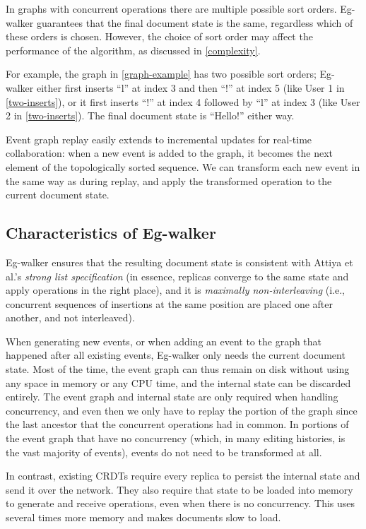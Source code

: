 \documentclass[sigplan,10pt]{acmart}
\newcommand{\algname}{Eg-walker\xspace}
\begin{document}
In graphs with concurrent operations there are multiple possible sort orders. \algname guarantees that the final document state is the same, regardless which of these orders is chosen. However, the choice of sort order may affect the performance of the algorithm, as discussed in \autoref{complexity}.

For example, the graph in \autoref{graph-example} has two possible sort orders; \algname either first inserts ``l'' at index 3 and then ``!'' at index 5 (like User 1 in \autoref{two-inserts}), or it first inserts ``!'' at index 4 followed by ``l'' at index 3 (like User 2 in \autoref{two-inserts}). The final document state is ``Hello!'' either way.

Event graph replay easily extends to incremental updates for real-time collaboration: when a new event is added to the graph, it becomes the next element of the topologically sorted sequence.
We can transform each new event in the same way as during replay, and apply the transformed operation to the current document state.

\subsection{Characteristics of \algname}\label{characteristics}

\algname ensures that the resulting document state is consistent with Attiya et al.'s \emph{strong list specification} \cite{Attiya2016} (in essence, replicas converge to the same state and apply operations in the right place), and it is \emph{maximally non-interleaving} \cite{fugue} (i.e., concurrent sequences of insertions at the same position are placed one after another, and not interleaved).

When generating new events, or when adding an event to the graph that happened after all existing events, \algname only needs the current document state.
Most of the time, the event graph can thus remain on disk without using any space in memory or any CPU time, and the internal state can be discarded entirely.
The event graph and internal state are only required when handling concurrency, and even then we only have to replay the portion of the graph since the last ancestor that the concurrent operations had in common.
In portions of the event graph that have no concurrency (which, in many editing histories, is the vast majority of events), events do not need to be transformed at all.

In contrast, existing CRDTs require every replica to persist the internal state and send it over the network.
They also require that state to be loaded into memory to generate and receive operations, even when there is no concurrency.
This uses several times more memory and makes documents slow to load.
\end{document}
